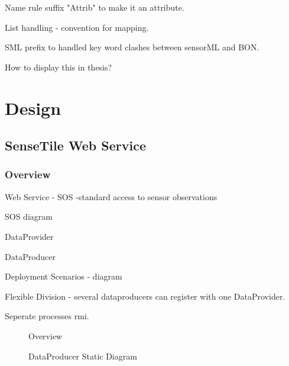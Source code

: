 \documentclass[]{final_report}
\begin{document}
Name rule suffix "Attrib" to make it an attribute.

List handling - convention for mapping.

SML prefix to handled key word clashes between sensorML and BON.

How to display this in thesis?
\chapter{Design}

\section{SenseTile Web Service}
\subsection{Overview}

Web Service - SOS -standard access to sensor observations

SOS diagram

DataProvider

DataProducer

Deployment Scenarios - diagram

Flexible Division - several dataproducers can register with one DataProvider.

Seperate processes rmi.
 \begin{figure}
\caption{Overview}\label{fig:SystemOverview.png}
\end{figure}


 \begin{figure}
\caption{DataProducer Static Diagram}\label{fig:sensetile_static_diagam.png}
\end{figure}
\end{document}
